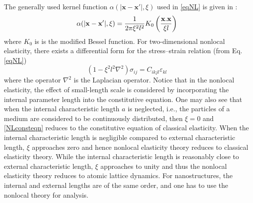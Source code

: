 The generally used kernel function $\alpha(|\mathbf{x-x'}|,\xi)$ used in \ref{eqNL} is given in \cite{eringen1972linear}:\\
\begin{equation}
\alpha(|\mathbf{x-x'}|,\xi) = \dfrac{1}{2 \pi \xi^2 l^2} K_0\left(\frac{\bf{x.x}}{\xi l}\right)
\end{equation}
where $K_0$ is is the modified Bessel function.
For two-dimensional nonlocal elasticity, there exists a differential form for the stress–strain relation (from Eq. \eqref{eqNL})\cite{eringen1972linear,eringen1976nonlocal,eringen1983differential,eringen1972nonlocal}\\
\begin{equation}
\left(1-\xi^2 l^2 \nabla^2\right)\sigma_{ij} = C_{ikjl}\varepsilon_{kl} \label{NLconsteqn}
\end{equation}
where the operator $\nabla^2$ is the Laplacian operator. Notice that in the
nonlocal elasticity, the effect of small-length scale is considered by
incorporating the internal parameter length into the constitutive
equation. One may also see that when the internal characteristic
length $a$ is neglected, i.e., the particles of a medium are considered
to be continuously distributed, then $\xi =0$ and \eqref{NLconsteqn} reduces to the
constitutive equation of classical elasticity. When the internal
characteristic length is negligible compared to external characteristic length, $\xi$ approaches zero and hence nonlocal elasticity theory reduces to classical elasticity theory. While the internal characteristic length is reasonably close to external characteristic length, $\xi$ approaches to unity and thus the nonlocal elasticity
theory reduces to atomic lattice dynamics. For nanostructures, the
internal and external lengths are of the same order, and one has to
use the nonlocal theory for analysis.
